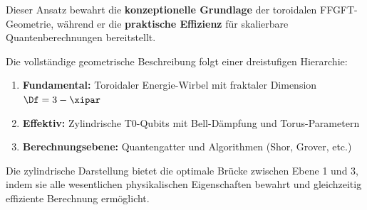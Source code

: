 Dieser Ansatz bewahrt die \textbf{konzeptionelle Grundlage} der toroidalen 
FFGFT-Geometrie, während er die \textbf{praktische Effizienz} für skalierbare 
Quantenberechnungen bereitstellt.

\begin{remark}
	Die vollständige geometrische Beschreibung folgt einer dreistufigen Hierarchie:
	\begin{enumerate}
		\item \textbf{Fundamental:} Toroidaler Energie-Wirbel mit fraktaler Dimension $\Df=3-\xipar$
		\item \textbf{Effektiv:} Zylindrische T0-Qubits mit Bell-Dämpfung und Torus-Parametern
		\item \textbf{Berechnungsebene:} Quantengatter und Algorithmen (Shor, Grover, etc.)
	\end{enumerate}
	Die zylindrische Darstellung bietet die optimale Brücke zwischen Ebene 1 und 3, 
	indem sie alle wesentlichen physikalischen Eigenschaften bewahrt und gleichzeitig 
	effiziente Berechnung ermöglicht.
\end{remark}

